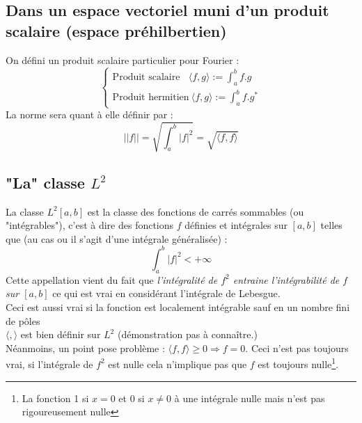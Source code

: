 \documentclass[british,french,11pt, a4paper, openany]{book}
\begin{document}
		\subsection{Dans un espace vectoriel muni d'un produit scalaire (espace préhilbertien)}
		On défini un produit scalaire particulier pour Fourier :
		\begin{equation}
			\left\{\begin{array}{l}
			\text{Produit scalaire}\ \ \ \ \langle f,g \rangle := \int_a^b f.g\\
			\text{Produit hermitien} \ \langle f,g \rangle := \int_a^b f.g^*
			\end{array}\right.
		\end{equation}
		La norme sera quant à elle définir par : 
		\begin{equation}
			||f|| = \sqrt{\int_a^b |f|^2} = \sqrt{\langle f,f\rangle}
		\end{equation}
		\subsection{"La" classe $L^2$}
		La classe $L^2[a,b]$ est la classe des fonctions de carrés sommables (ou "intégrables"), c'est à dire des fonctions $f$ définies et intégrales sur $[a,b]$ telles que (au cas ou il s'agit d'une intégrale généralisée) :
		\begin{equation}
			\int_a^b |f|^2 < +\infty
		\end{equation}
		Cette appellation vient du fait que \textit{l'intégralité de $f^2$ entraine l'intégrabilité de $f$ sur $[a,b]$} ce qui est vrai en considérant l'intégrale de Lebesgue.\\
		Ceci est aussi vrai si la fonction est localement intégrable sauf en un nombre fini de pôles\\
									
		$\langle , \rangle$ est bien définir sur $L^2$ (démonstration pas à connaître.)\\
		Néanmoins, un point pose problème : $\langle f,f \rangle \geq 0 \Rightarrow f = 0$. Ceci n'est pas toujours vrai, si l'intégrale de $f^2$ est nulle cela n'implique pas que $f$ est toujours nulle\footnote{La fonction 1 si $x=0$ et 0 si $x\neq 0$ à une intégrale nulle mais n'est pas rigoureusement nulle}.\\
									
\end{document}
